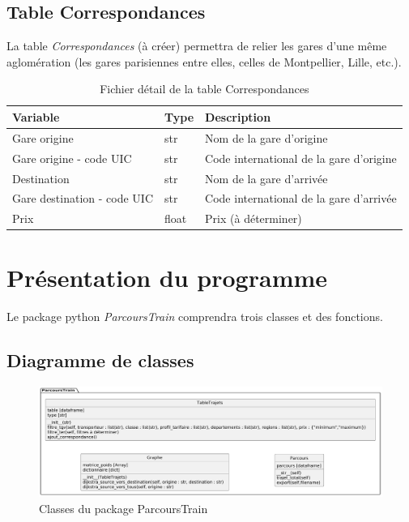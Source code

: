 \documentclass[
]{article}
\begin{document}
\hypertarget{table-correspondances}{%
\subsection{Table Correspondances}\label{table-correspondances}}

La table \emph{Correspondances} (à créer) permettra de relier les gares d'une même aglomération (les gares parisiennes entre elles, celles de Montpellier, Lille, etc.).

\begin{table}[H]

\caption{\label{tab:tablecorrespondances}Fichier détail de la table Correspondances}
\centering
\begin{tabular}[t]{l|l|l}
\hline
Variable & Type & Description\\
\hline
Gare origine & str & Nom de la gare d’origine\\
\hline
Gare origine - code UIC & str & Code international de la gare d’origine\\
\hline
Destination & str & Nom de la gare d’arrivée\\
\hline
Gare destination - code UIC & str & Code international de la gare d’arrivée\\
\hline
Prix & float & Prix (à déterminer)\\
\hline
\end{tabular}
\end{table}

\hypertarget{pruxe9sentation-du-programme}{%
\section{Présentation du programme}\label{pruxe9sentation-du-programme}}

Le package python \emph{ParcoursTrain} comprendra trois classes et des fonctions.

\hypertarget{diagramme-de-classes}{%
\subsection{Diagramme de classes}\label{diagramme-de-classes}}

\begin{figure}
\centering
\includegraphics{umlclasses.pdf}
\caption{Classes du package ParcoursTrain}
\end{figure}
\end{document}
